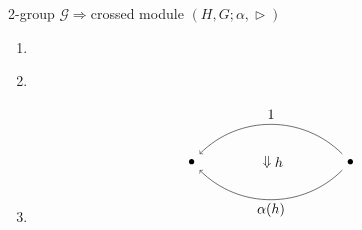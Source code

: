 \documentclass[12pt,aspectratio=53,mathserif]{beamer}
\begin{document}
  \begin{frame}
      {2-group $\mathcal{G} \Longrightarrow $crossed module $\left(H,G;\alpha,\vartriangleright \right)$}
      \begin{enumerate} 
      \item {}
      \item {}\\
      \item {}
       $$\begin{tikzpicture}
          \node[black](a)at(0, 0){$\bullet $};
          \node[black](b)at(4, 0){$\bullet $};
          \node[black](c)at(2, 1.2){$1$};
          \node[black](c)at(2, -1.2){$\alpha(h)$};
          \draw[<-](a)to [bend left=45](b);
          \draw[<-](a)to [bend right=45](b);
          \node[black]at(2. 2, 0. 0){$h$};
          \node[black]at(1. 9, 0. 0){$\Downarrow $};
      \end{tikzpicture}$$
       \end{enumerate} 
    \end{frame}
      
     
      
\end{document}
